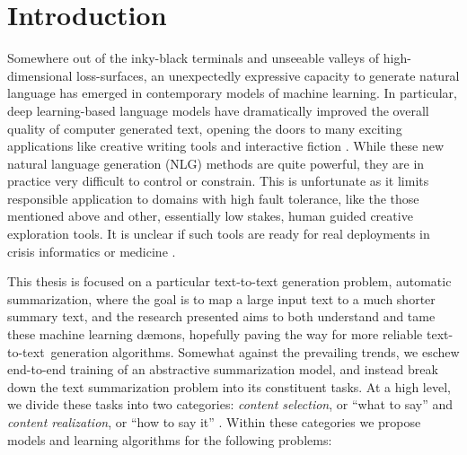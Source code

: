 \chapter{Introduction}



\addvspace{6\bigskipamount}

\startglyph Somewhere out of the inky-black terminals and  unseeable valleys of
high-dimensional loss-surfaces, an unexpectedly expressive capacity to generate
natural language has emerged in contemporary models of machine learning.  In
particular, deep learning-based language models have dramatically improved the
overall quality of computer generated text, opening the doors to many exciting
applications like creative writing tools
\citep{huggingface2019,samuel2019,seabrook2019} and interactive fiction
\citep{robertson2019}.  While these new natural language generation (NLG)
methods are quite powerful, they are in practice very difficult to control or
constrain. This is unfortunate as it limits responsible application to domains
with high fault tolerance, like the those mentioned above and other,
essentially low stakes, human guided creative exploration tools. It is unclear
if such tools are ready for real deployments in crisis informatics
\citep{starbird2013} or medicine \citep{gatt2009}.

This thesis is focused on a particular text-to-text generation problem,
automatic summarization, where the goal is to map a large input text to a much
shorter summary text, and the research presented aims to both understand and
tame these machine learning d{\ae}mons, hopefully paving the way for more
reliable text-to-text~generation algorithms.  Somewhat against the prevailing
trends, we eschew end-to-end training of an abstractive summarization model,
and instead break down the text summarization problem into its constituent
tasks.  At a high level, we divide these tasks into two categories:
\textit{content selection}, or ``what to say'' and \textit{content
realization}, or ``how to say it'' \citep{mckeown1985}.  Within these
categories we propose models and learning algorithms for the following
problems:
    
